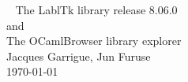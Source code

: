 \documentclass[11pt]{book}
\begin{document}
\thispagestyle{empty}
\begin{center}
~\vfill
\Huge           The LablTk library
                release 8.06.0 \\
                and \\
                The OCamlBrowser library explorer \\[1cm]
\large          Jacques Garrigue, Jun Furuse \\
                \today \\
\vfill
\end{center}
\setcounter{page}{1}



\end{document}
